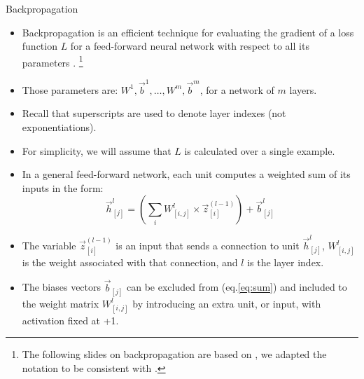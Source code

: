 \documentclass[handout]{beamer}
\begin{document}
\begin{frame}{Backpropagation}
\begin{scriptsize}


\begin{itemize}
\item Backpropagation is an efficient technique for evaluating the gradient
of a loss function $L$ for a feed-forward neural network with respect to all its parameters \cite{bishop2006pattern}. \footnote{The following slides on backpropagation are based on \cite{bishop2006pattern}, we adapted the notation to be consistent with \cite{goldberg2017neural}.}
\item Those parameters are: $W^1, \vec{b}^1, \dots, W^m, \vec{b}^m$, for a network of $m$ layers.
\item Recall that superscripts are used to denote layer indexes (not exponentiations).
\item For simplicity, we will assume that $L$ is calculated over a single example.

\item In a general feed-forward network, each unit computes a weighted sum of its inputs in the form:
\begin{equation}
\vec{h}_{[j]}^l = \left(\sum_{i}  W_{[i,j]}^l \times \vec{z}_{[i]}^{(l-1)}\right) + \vec{b}_{[j]}^l 
\label{eq:sum}
\end{equation}

\item The variable $\vec{z}_{[i]}^{(l-1)}$ is an input that sends a connection to unit $\vec{h}_{[j]}^l$, $W_{[i,j]}^l$ is the weight associated with that connection, and $l$ is the layer index.

\item The biases vectors  $\vec{b}_{[j]}$ can be excluded from (eq.\ref{eq:sum}) and included to the weight matrix $W_{[i,j]}^l$ by introducing an extra unit, or input, with activation fixed at +1.

\end{itemize}


\end{scriptsize}
\end{frame}
\end{document}
